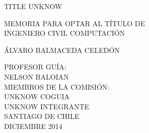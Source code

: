 \documentclass[11pt,oneside,letterpaper,leqno]{report}
\newcommand{\memtitle}{TITLE UNKNOW}
\newcommand{\autor}{Álvaro Balmaceda Celedón}
\newcommand{\profesor}{Nelson Baloian}
\newcommand{\coguia}{UNKNOW COGUIA}
\newcommand{\integrante}{UNKNOW INTEGRANTE}
\newcommand{\fecha}{Diciembre 2014}
\newcommand{\tipomemoria}{INGENIERO CIVIL COMPUTACIÓN}
\newcommand{\Memtitle}{\MakeUppercase{\memtitle}}
\newcommand{\Author}{\MakeUppercase{\autor}}
\newcommand{\Profesor}{\MakeUppercase{\profesor}}
\newcommand{\Coguia}{\MakeUppercase{\coguia}}
\newcommand{\Integrante}{\MakeUppercase{\integrante}}
\newcommand{\Fecha}{\MakeUppercase{\fecha}}
\newcommand{\Tipomemoria}{\MakeUppercase{\tipomemoria}}
\begin{document}
\begin{center}
\vspace{4cm}

\Memtitle

\vspace{2cm}

MEMORIA PARA OPTAR AL TÍTULO DE\\
\Tipomemoria

\vspace{2cm}

\Author

\vspace{1cm}
PROFESOR GUÍA:\\
\Profesor \\
\vspace{1cm}
MIEMBROS DE LA COMISIÓN:\\
\Coguia \\
\Integrante \\
\vfill
SANTIAGO DE CHILE\\
\Fecha
\end{center}
\end{document}
